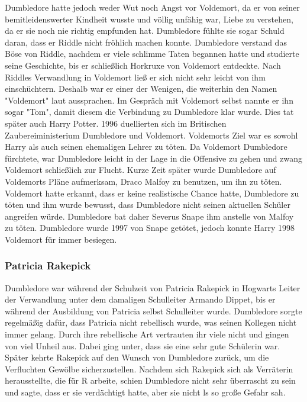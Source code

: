\documentclass[a4paper, 10pt]{article}
\begin{document}
\newline
{}  
Dumbledore hatte jedoch weder Wut noch Angst vor Voldemort, da er von seiner bemitleidenswerter Kindheit wusste und völlig unfähig war, Liebe zu verstehen, da er sie noch nie richtig empfunden hat. Dumbledore fühlte sie sogar Schuld daran, dass er Riddle nicht fröhlich machen konnte. Dumbledore verstand das Böse von Riddle, nachdem er viele schlimme Taten begannen hatte und studierte seine Geschichte, bis er schließlich Horkruxe von Voldemort entdeckte. Nach Riddles Verwandlung in Voldemort ließ er sich nicht sehr leicht von ihm einschüchtern. Deshalb war er einer der Wenigen, die weiterhin den Namen "Voldemort" laut aussprachen. Im Gespräch mit Voldemort selbst nannte er ihn sogar "Tom", damit diesem die Verbindung zu Dumbledore klar wurde. Dies tat später auch Harry Potter.
\vspace{10pt}
\newline
{}  
1996 duellierten sich im Britischen Zaubereiministerium Dumbledore und Voldemort. Voldemorts Ziel war es sowohl Harry als auch seinen ehemaligen Lehrer zu töten. Da Voldemort Dumbledore fürchtete, war Dumbledore leicht in der Lage in die Offensive zu gehen und zwang Voldemort schließlich zur Flucht. Kurze Zeit später wurde Dumbledore auf Voldemorts Pläne aufmerksam, Draco Malfoy zu benutzen, um ihn zu töten. Voldemort hatte erkannt, dass er keine realistische Chance hatte, Dumbledore zu töten und ihm wurde bewusst, dass Dumbledore nicht seinen aktuellen Schüler angreifen würde. Dumbledore bat daher Severus Snape ihm anstelle von Malfoy zu töten. Dumbledore wurde 1997 von Snape getötet, jedoch konnte Harry 1998 Voldemort für immer besiegen.
\subsubsection*{\large Patricia Rakepick}
Dumbledore war während der Schulzeit von Patricia Rakepick in Hogwarts Leiter der Verwandlung unter dem damaligen Schulleiter Armando Dippet, bis er während der Ausbildung von Patricia selbst Schulleiter wurde. Dumbledore sorgte regelmäßig dafür, dass Patricia nicht rebellisch wurde, was seinen Kollegen nicht immer gelang. Durch ihre rebellische Art vertrauten ihr viele nicht und gingen von viel Unheil aus. Dabei ging unter, dass sie eine sehr gute Schülerin war. Später kehrte Rakepick auf den Wunsch von Dumbledore zurück, um die Verfluchten Gewölbe sicherzustellen.
\vspace{10pt}
\newline
{}  
Nachdem sich Rakepick sich als Verräterin herausstellte, die für R arbeite, schien Dumbledore nicht sehr überrascht zu sein und sagte, dass er sie verdächtigt hatte, aber sie nicht ls so große Gefahr sah.
\end{document}
